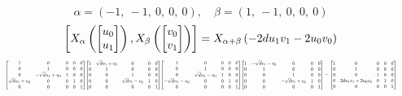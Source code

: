\documentclass[11pt]{article}
\theoremstyle{definition}
\begin{document}
\[
\alpha = \left( -1, \  -1, \  0, \  0, \  0\right), \quad \beta = \left( 1, \  -1, \  0, \  0, \  0\right)
\]
\[
\scaletoalign{\textwidth}{\left[ X_{\alpha}\left(\left[\begin{matrix}u_{0}\\u_{1}\end{matrix}\right]\right), X_{\beta}\left(\left[\begin{matrix}v_{0}\\v_{1}\end{matrix}\right]\right) \right] = X_{\alpha + \beta}\left(- 2 d u_{1} v_{1} - 2 u_{0} v_{0}\right)}
\]
\[
\scaletoalign{\textwidth}{{\left[\begin{matrix}1 & 0 & 0 & 0 & 0\\0 & 1 & 0 & 0 & 0\\0 & - \sqrt{d} u_{1} + u_{0} & 1 & 0 & 0\\\sqrt{d} u_{1} + u_{0} & 0 & 0 & 1 & 0\\0 & 0 & 0 & 0 & 1\end{matrix}\right]} {\left[\begin{matrix}1 & \sqrt{d} v_{1} + v_{0} & 0 & 0 & 0\\0 & 1 & 0 & 0 & 0\\0 & 0 & 1 & 0 & 0\\0 & 0 & \sqrt{d} v_{1} - v_{0} & 1 & 0\\0 & 0 & 0 & 0 & 1\end{matrix}\right]} {\left[\begin{matrix}1 & 0 & 0 & 0 & 0\\0 & 1 & 0 & 0 & 0\\0 & \sqrt{d} u_{1} - u_{0} & 1 & 0 & 0\\- \sqrt{d} u_{1} - u_{0} & 0 & 0 & 1 & 0\\0 & 0 & 0 & 0 & 1\end{matrix}\right]} {\left[\begin{matrix}1 & - \sqrt{d} v_{1} - v_{0} & 0 & 0 & 0\\0 & 1 & 0 & 0 & 0\\0 & 0 & 1 & 0 & 0\\0 & 0 & - \sqrt{d} v_{1} + v_{0} & 1 & 0\\0 & 0 & 0 & 0 & 1\end{matrix}\right]} = {\left[\begin{matrix}1 & 0 & 0 & 0 & 0\\0 & 1 & 0 & 0 & 0\\0 & 0 & 1 & 0 & 0\\0 & 2 d u_{1} v_{1} + 2 u_{0} v_{0} & 0 & 1 & 0\\0 & 0 & 0 & 0 & 1\end{matrix}\right]}}
\]
\end{document}
